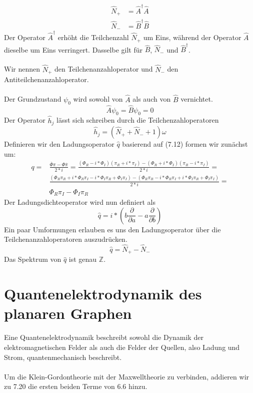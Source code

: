 \documentclass[11pt,a4paper,leqno]{report}
\numberwithin{equation}{chapter}
\begin{document}
\begin{align*}
	\hat{N}_+ &= \hat{A}^\dagger \hat{A}\\
	\hat{N}_- &= \hat{B}^\dagger \hat{B}
\end{align*}
Der Operator $\hat{A}^\dagger$ erh\"oht die Teilchenzahl $\hat{N}_+$ um Eins, während der Operator $\hat{A}$ dieselbe um Eins verringert. Dasselbe gilt f\"ur $\hat{B}$, $\hat{N}_-$ und $\hat{B}^\dagger$.\\
\\
Wir nennen $\hat{N}_+$ den Teilchenanzahloperator und $\hat{N}_-$ den Antiteilchenanzahloperator.\\
\\
Der Grundzustand $\psi_0$ wird sowohl von $\hat{A}$ als auch von $\hat{B}$ vernichtet. 
\begin{equation*}
	\hat{A}\psi_0 = \hat{B}\psi_0 = 0
\end{equation*}
Der Operator $\hat{h}_j$ l\"asst sich schreiben durch die Teilchenzahloperatoren
\begin{equation*}
	\hat{h}_j = (\hat{N}_+ +\hat{N}_- + 1)\omega
\end{equation*}
Definieren wir den Ladungsoperator $\hat{q}$ basierend auf (7.12) formen wir zun\"achst um:
\begin{align*}
	q=&\frac{\overline{\Phi}\pi - \Phi\overline{\pi}}{2*i}=
	\frac{(\Phi_R - i*\Phi_I)(\pi_R + i * \pi_I) - (\Phi_R + i*\Phi_I)(\pi_R - i * \pi_I)}{2*i}=\\
	&\frac{(\Phi_R\pi_R+i * \Phi_R\pi_I- i*\Phi_I\pi_R+\Phi_I\pi_I)-
	 (\Phi_R\pi_R-i * \Phi_R\pi_I+ i*\Phi_I\pi_R+\Phi_I\pi_I)}{2*i}=\\
 	&\Phi_R\pi_I-\Phi_I\pi_R
\end{align*} 
Der Ladungsdichteoperator wird nun definiert als 
\begin{equation}
	\hat{q}=i*(b\frac{\partial}{\partial a}- a\frac{\partial}{\partial b})
\end{equation}
Ein paar Umformungen erlauben es uns den Ladungsoperator \"uber die Teilchenanzahloperatoren auszudr\"ucken.
\begin{equation*}
	\hat{q} = \hat{N}_+ -\hat{N}_- 
\end{equation*}
Das Spektrum von $\hat{q}$ ist genau $\mathbb{Z}$.
\chapter{Quantenelektrodynamik des planaren Graphen}
Eine Quantenelektrodynamik beschreibt sowohl die Dynamik der elektromagnetischen Felder als auch die Felder der Quellen, also Ladung und Strom, quantenmechanisch beschreibt.\\
\\ 
Um die Klein-Gordontheorie mit der Maxwelltheorie zu verbinden, addieren wir zu 7.20 die ersten beiden Terme von 6.6 hinzu.
\end{document}
